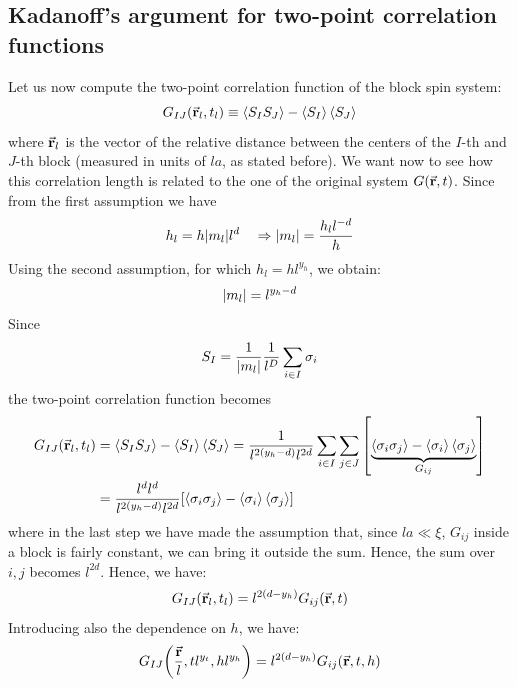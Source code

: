 \documentclass[../../Main/Main.tex]{subfiles}
\begin{document}
\subsection{Kadanoff's argument for two-point correlation functions}
Let us now compute the two-point correlation function of the block spin system:
\begin{equation}
  G_{IJ} (\va{r}_l, t_l) \equiv \expval{S_I S_J} - \expval{S_I}\expval{S_J}
\end{equation}
where \( \va{r}_l \) is the vector of the relative distance between the centers of the \( I \)-th and \( J \)-th block (measured in units of \( la \), as stated before). We want now to see how this correlation length is related to the one of the original system \( G(\va{r},t) \).
Since from the first assumption we have
\begin{equation*}
  h_l = h \abs{m_l} l^d \quad \Rightarrow \abs{m_l} = \frac{h_l l^{-d}}{h}
\end{equation*}
Using the second assumption, for which \( h_l = h l^{y_h} \), we obtain:
\begin{equation*}
  \abs{m_l} = l^{y_h-d}
\end{equation*}
Since
\begin{equation*}
  S_I = \frac{1}{\abs{m_l} } \frac{1}{l^D} \sum_{i \in I}^{} \sigma _i
\end{equation*}
the two-point correlation function becomes
\begin{equation*}
\begin{split}
  G_{IJ} (\va{r}_l, t_l) &=  \expval{S_I S_J} - \expval{S_I} \expval{S_J}
   = \frac{1}{l^{2 (y_h - d)} l^{2d}} \sum_{i \in I}^{} \sum_{j \in J}^{} \qty[ \underbrace{\expval{\sigma _i \sigma _j} - \expval{\sigma _i} \expval{\sigma _j} }_{ G_{ij} }    ] \\
  & = \frac{l^d l^d}{l^{2(y_h-d)}l^{2d}} \qty[ \expval{\sigma _i \sigma _j} - \expval{\sigma _i} \expval{\sigma _j}  ]
\end{split}
\end{equation*}
where in the last step we have made the assumption that, since \( la \ll \xi  \), \( G_{ij} \) inside a block is fairly constant, we can bring it outside the sum. Hence, the sum over \( i,j \) becomes \( l^{2d} \).
Hence, we have:
\begin{equation}
  G_{IJ} (\va{r}_l, t_l) = l^{2(d-y_h)} G_{ij} (\va{r},t)
\end{equation}
Introducing also the dependence on \( h \), we have:
\begin{equation}
  G_{IJ} \qty(\frac{\va{r}}{l}, t l^{y_t}, h l^{y_h}) = l^{2 (d- y_h)} G_{ij} (\va{r},t,h)
 \end{equation}
\end{document}
